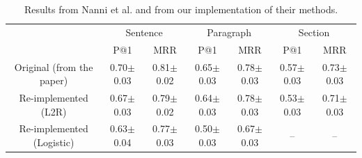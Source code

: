 \begin{table}[t]
\caption{Results from Nanni et al.\cite{nanni2018entity} and from our implementation of their methods.}
\label{tab:Reproducible-results}
\begin{tabular}{|c|c|c|c|c|c|c|}
\hline
                          &               &               &                &               &               &               \\ \hline
                          & \multicolumn{2}{c|}{Sentence} & \multicolumn{2}{c|}{Paragraph} & \multicolumn{2}{c|}{Section}  \\ \hline
                          & P@1           & MRR           & P@1            & MRR           & P@1           & MRR           \\ \hline
Original (from the paper) & 0.70$\pm$0.03 & 0.81$\pm$0.02 & 0.65$\pm$0.03  & 0.78$\pm$0.03 & 0.57$\pm$0.03 & 0.73$\pm$0.03 \\ \hline
Re-implemented (L2R)            & 0.67$\pm$0.03 & 0.79$\pm$0.02 & 0.64$\pm$0.03  & 0.78$\pm$0.03 & 0.53$\pm$0.03 & 0.71$\pm$0.03 \\ \hline Re-implemented (Logistic)            &0.63$\pm$0.04 & 0.77$\pm$0.03 & 0.50$\pm$0.03  & 0.67$\pm$0.03 & -- & -- \\\hline
\end{tabular}
\end{table}

